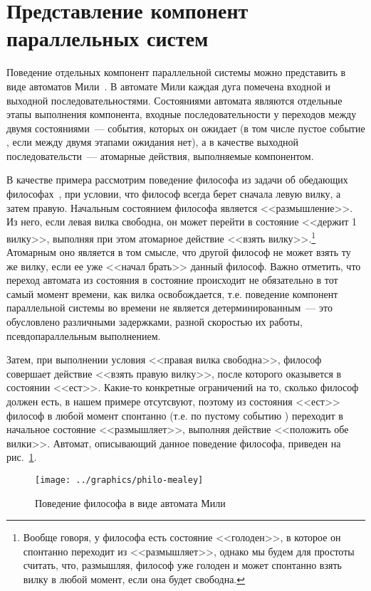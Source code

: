 \section{Представление компонент параллельных систем}
\label{sec:parsystem-formalization}

Поведение отдельных компонент параллельной системы можно представить в виде автоматов
Мили~\cite{Velder}. В автомате Мили каждая дуга помечена входной и выходной
последовательностями. Состояниями автомата являются отдельные этапы выполнения компонента,
входные последовательности у переходов между двумя состояниями~--- события, которых он
ожидает (в том числе пустое событие , если между двумя этапами ожидания нет),
а в качестве выходной последовательсти~--- атомарные действия, выполняемые компонентом.

В качестве примера рассмотрим поведение философа из задачи об обедающих
философах~\cite{Dijkstra}, при условии, что философ всегда берет сначала левую вилку, а
затем правую. Начальным состоянием философа является <<размышление>>. Из него, если левая
вилка свободна, он может перейти в состояние <<держит 1 вилку>>, выполняя при этом
атомарное действие <<взять вилку>>.\footnote{Вообще говоря, у философа есть состояние
  <<голоден>>, в которое он спонтанно переходит из <<размышляет>>, однако мы будем для
  простоты считать, что, размышляя, философ уже голоден и может спонтанно взять вилку в
  любой момент, если она будет свободна.} Атомарным оно является в том смысле, что другой
философ не может взять ту же вилку, если ее уже <<начал брать>> данный философ. Важно
отметить, что переход автомата из состояния в состояние происходит не обязательно в тот
самый момент времени, как вилка освобождается, т.е. поведение компонент параллельной
системы во времени не является детерминированным~--- это обусловлено различными задержками,
разной скоростью их работы, псевдопараллельным выполнением\etc.

Затем, при выполнении условия <<правая вилка свободна>>, философ совершает действие
<<взять правую вилку>>, после которого оказывется в состоянии <<ест>>. Какие-то конкретные
ограничений на то, сколько философ должен есть, в нашем примере отсутсвуют, поэтому из
состояния <<ест>> философ в любой момент спонтанно (т.е. по пустому событию )
переходит в начальное состояние <<размышляет>>, выполняя действие <<положить обе
вилки>>. Автомат, описывающий данное поведение философа, приведен на рис.~\ref{fig:philo-mealey}.

\begin{figure}[ht]
  \centering
  \texttt{[image: ../graphics/philo-mealey]}
  \caption{Поведение философа в виде автомата Мили}
  \label{fig:philo-mealey}
\end{figure}

